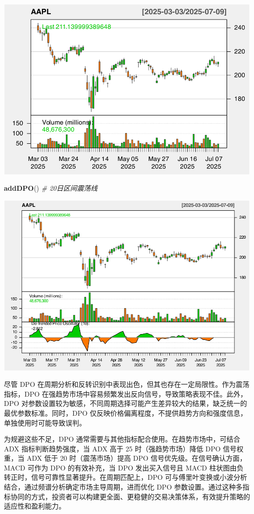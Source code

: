\documentclass[]{ctexbook}
\newenvironment{Shaded}{\begin{snugshade}}{\end{snugshade}}
\newcommand{\CommentTok}[1]{\textcolor[rgb]{0.56,0.35,0.01}{\textit{#1}}}
\newcommand{\FunctionTok}[1]{\textcolor[rgb]{0.13,0.29,0.53}{\textbf{#1}}}
\newcommand{\NormalTok}[1]{#1}
\begin{document}
\includegraphics[width=0.9\linewidth]{quantmod_files/figure-latex/dpo-1}

\begin{Shaded}
\begin{Highlighting}[]
\FunctionTok{addDPO}\NormalTok{()  }\CommentTok{\# 20日区间震荡线}
\end{Highlighting}
\end{Shaded}

\includegraphics[width=0.9\linewidth]{quantmod_files/figure-latex/dpo-2}

尽管 DPO 在周期分析和反转识别中表现出色，但其也存在一定局限性。作为震荡指标，DPO 在强趋势市场中容易频繁发出反向信号，导致策略表现不佳。此外，DPO 对参数设置较为敏感，不同周期选择可能产生差异较大的结果，缺乏统一的最优参数标准。同时，DPO 仅反映价格偏离程度，不提供趋势方向和强度信息，单独使用时可能导致误判。

为规避这些不足，DPO 通常需要与其他指标配合使用。在趋势市场中，可结合 ADX 指标判断趋势强度，当 ADX 高于 25 时（强趋势市场）降低 DPO 信号权重，当 ADX 低于 20 时（震荡市场）提高 DPO 信号优先级。在信号确认方面，MACD 可作为 DPO 的有效补充，当 DPO 发出买入信号且 MACD 柱状图由负转正时，信号可靠性显著提升。在周期匹配上，DPO 可与傅里叶变换或小波分析结合，通过频谱分析确定市场主导周期，进而优化 DPO 参数设置。通过这种多指标协同的方式，投资者可以构建更全面、更稳健的交易决策体系，有效提升策略的适应性和盈利能力。
\end{document}

